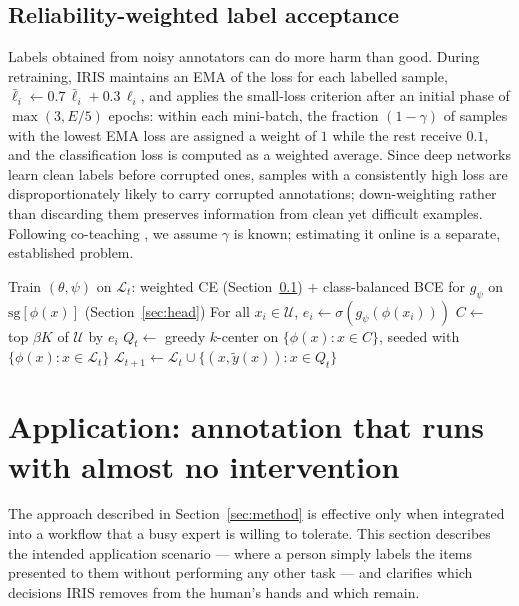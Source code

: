 \documentclass[a4paper,fleqn,longmktitle]{cas-sc}
\newcommand{\method}{IRIS}
\begin{document}
\subsection{Reliability-weighted label acceptance}\label{sec:rel}
Labels obtained from noisy annotators can do more harm than good.
During retraining, \method{} maintains an EMA of the loss for each
labelled sample, $\bar{\ell}_i\leftarrow0.7\,\bar{\ell}_i+0.3\,\ell_i$,
and applies the small-loss criterion \citep{han2018} after an initial
phase of $\max(3,E/5)$ epochs: within each mini-batch, the fraction
$(1-\gamma)$ of samples with the lowest EMA loss are assigned a weight
of $1$ while the rest receive $0.1$, and the classification loss is
computed as a weighted average. Since deep networks learn clean labels
before corrupted ones, samples with a consistently high loss are
disproportionately likely to carry corrupted annotations;
down-weighting rather than discarding them preserves information from
clean yet difficult examples. Following co-teaching \citep{han2018}, we
assume $\gamma$ is known; estimating it online is a separate,
established problem.

\begin{algorithm}[htbp]
\caption{\method{}: one active learning round}
\begin{algorithmic}[1]
\State Train $(\theta, \psi)$ on $\mathcal{L}_t$: weighted CE
(Section~\ref{sec:rel}) $+$ class-balanced BCE
for $g_\psi$ on $\mathrm{sg}[\phi(x)]$ (Section~\ref{sec:head})
\State For all $x_i\in\mathcal{U}$, $e_i\gets\sigma(g_\psi(\phi(x_i)))$
\State $C\gets$ top $\beta K$ of $\mathcal{U}$ by $e_i$
\State $Q_t\gets$ greedy $k$-center on $\{\phi(x):x\in C\}$, seeded with
$\{\phi(x):x\in\mathcal{L}_t\}$
\State $\mathcal{L}_{t+1}\gets\mathcal{L}_t\cup\{(x,\tilde{y}(x)):x\in Q_t\}$
\end{algorithmic}
\end{algorithm}

\section{Application: annotation that runs with almost no intervention}
\label{sec:application}
The approach described in Section~\ref{sec:method} is effective only
when integrated into a workflow that a busy expert is willing to
tolerate. This section describes the intended application scenario ---
where a person simply labels the items presented to them without
performing any other task --- and clarifies which decisions \method{}
removes from the human's hands and which remain.
\end{document}
